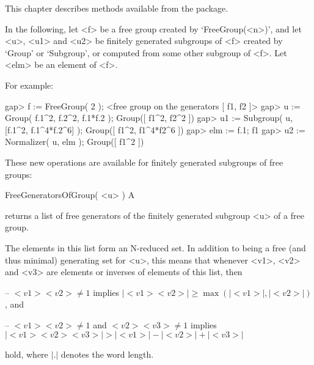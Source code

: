 


This chapter describes methods available from the {\FGA} package.

In the following, let <f> be a free group created by `FreeGroup(<n>)',
and let <u>, <u1> and <u2> be finitely generated subgroups of <f>
created by `Group' or `Subgroup', or computed from some other subgroup
of <f>.  Let <elm> be an element of <f>.

For example:

\beginexample
gap> f := FreeGroup( 2 );                                             
<free group on the generators [ f1, f2 ]>
gap> u := Group( f.1^2, f.2^2, f.1*f.2 );
Group([ f1^2, f2^2 ])
gap> u1 := Subgroup( u, [f.1^2, f.1^4*f.2^6] );
Group([ f1^2, f1^4*f2^6 ])
gap> elm := f.1;
f1
gap> u2 := Normalizer( u, elm );
Group([ f1^2 ])
\endexample


These new operations are available for finitely generated subgroups of
free groups:

\>FreeGeneratorsOfGroup( <u> ) A

returns a list of free generators of the finitely generated subgroup
<u> of a free group.

The elements in this list form an N-reduced set.  In addition to
being a free (and thus minimal) generating set for <u>, this means
that whenever <v1>, <v2> and <v3> are elements or inverses of elements
of this list, then

\beginlist%
  \item{--}
    $<v1><v2>\neq1$ implies $|<v1><v2>|\geq\max(|<v1>|, |<v2>|)$, and
  \item{--}
    $<v1><v2>\neq1$ and $<v2><v3>\neq1$ implies
    $|<v1><v2><v3>| > |<v1>| - |<v2>| + |<v3>|$
\endlist

hold, where $|.|$ denotes the word length.

